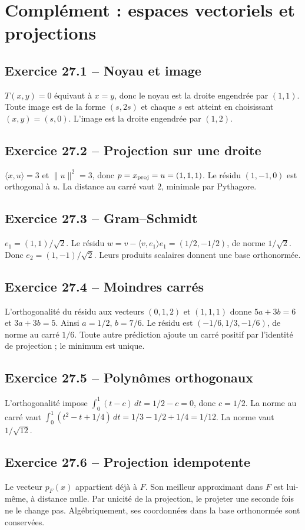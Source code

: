 \chapter{Complément : espaces vectoriels et projections}
\section*{Exercice 27.1 -- Noyau et image}
$T(x,y)=0$ équivaut à $x=y$, donc le noyau est la droite engendrée par $(1,1)$. Toute image est de la forme $(s,2s)$ et chaque $s$ est atteint en choisissant $(x,y)=(s,0)$. L'image est la droite engendrée par $(1,2)$.

\section*{Exercice 27.2 -- Projection sur une droite}
$\langle x,u\rangle=3$ et $\|u\|^2=3$, donc $p=x_{\rm proj}=u=(1,1,1)$. Le résidu $(1,-1,0)$ est orthogonal à $u$. La distance au carré vaut $2$, minimale par Pythagore.

\section*{Exercice 27.3 -- Gram--Schmidt}
$e_1=(1,1)/\sqrt2$. Le résidu $w=v-\langle v,e_1\rangle e_1=(1/2,-1/2)$, de norme $1/\sqrt2$. Donc $e_2=(1,-1)/\sqrt2$. Leurs produits scalaires donnent une base orthonormée.

\section*{Exercice 27.4 -- Moindres carrés}
L'orthogonalité du résidu aux vecteurs $(0,1,2)$ et $(1,1,1)$ donne $5a+3b=6$ et $3a+3b=5$. Ainsi $a=1/2$, $b=7/6$. Le résidu est $(-1/6,1/3,-1/6)$, de norme au carré $1/6$. Toute autre prédiction ajoute un carré positif par l'identité de projection ; le minimum est unique.

\section*{Exercice 27.5 -- Polynômes orthogonaux}
L'orthogonalité impose $\int_0^1(t-c)\,dt=1/2-c=0$, donc $c=1/2$. La norme au carré vaut $\int_0^1(t^2-t+1/4)\,dt=1/3-1/2+1/4=1/12$. La norme vaut $1/\sqrt{12}$.

\section*{Exercice 27.6 -- Projection idempotente}
Le vecteur $p_F(x)$ appartient déjà à $F$. Son meilleur approximant dans $F$ est lui-même, à distance nulle. Par unicité de la projection, le projeter une seconde fois ne le change pas. Algébriquement, ses coordonnées dans la base orthonormée sont conservées.
